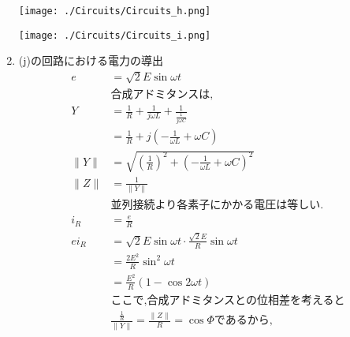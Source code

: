 \documentclass[twocolumn]{article}
\begin{document}
\begin{enumerate}
        \begin{center}
            \texttt{[image: ./Circuits/Circuits\_h.png]}
          \end{center}
          \begin{center}
            \texttt{[image: ./Circuits/Circuits\_i.png]}
          \end{center}
  \item (j)の回路における電力の導出
        \begin{align*}
          e               & = \sqrt{2}E\sin\omega t                                                                 \\
                          & \text{合成アドミタンスは,}                                                                       \\
          Y               & = \frac{1}{R} + \frac{1}{j\omega L} + \frac{1}{\frac{1}{j\omega C}}                     \\
                          & = \frac{1}{R} + j\left(-\frac{1}{\omega L} + \omega C\right)                            \\
          \|Y\|           & = \sqrt{{\left(\frac{1}{R}\right)}^2 + {\left(-\frac{1}{\omega L} + \omega C\right)}^2} \\
          \|Z\|           & = \frac{1}{\|Y\|}                                                                       \\
                          & \text{並列接続より各素子にかかる電圧は等しい.}                                                             \\
          i_R             & = \frac{e}{R}                                                                           \\
          ei_R            & = \sqrt{2}E\sin\omega t \cdot \frac{\sqrt{2}E}{R}\sin\omega t                           \\
                          & = \frac{2E^2}{R}\sin^2 \omega t                                                         \\
                          & = \frac{E^2}{R}\left(1 - \cos 2 \omega t\right)                                         \\
                          & \text{ここで,合成アドミタンスとの位相差を考えると}                                                           \\
                          & \frac{\frac{1}{R}}{\|Y\|} = \frac{\|Z\|}{R} = \cos \Phi\text{であるから,}                    \\

\end{align*}
\end{enumerate}
\end{document}
